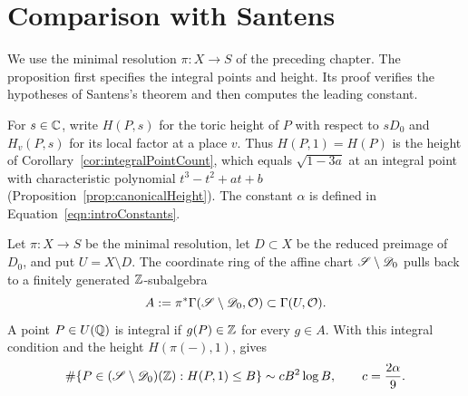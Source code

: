 \chapter{Comparison with Santens}

We use the minimal resolution $\pi:X\to S$ of the preceding chapter. The proposition first specifies the integral points and height. Its proof verifies the hypotheses of Santens's theorem and then computes the leading constant.

\begin{proposition}

\label{prop:santensConstant}


\leanok

For $s\in\mathbb{C}$, write $H(P,s)$ for the toric height of $P$ with respect to $sD_0$ and $H_v(P,s)$ for its local factor at a place $v$. Thus $H(P,1)=H(P)$ is the height of Corollary~\ref{cor:integralPointCount}, which equals $\sqrt{1-3a}$ at an integral point with characteristic polynomial $t^3-t^2+at+b$ (Proposition~\ref{prop:canonicalHeight}). The constant $\alpha$ is defined in Equation~\ref{eqn:introConstants}.

 Let $\pi\colon X\to S$ be the minimal resolution, let $D\subset X$ be the reduced preimage of $D_0$, and put $U=X\setminus D$. The coordinate ring of the affine chart $\mathscr{S}\setminus\mathscr{D}_0$ pulls back to a finitely generated $\mathbb{Z}$-subalgebra \[ A:=\pi^*\Gamma(\mathscr{S}\setminus\mathscr{D}_0,\mathcal O) \subset\Gamma(U,\mathcal O). \] A point $P\in U(\mathbb{Q})$ is integral if $g(P)\in\mathbb{Z}$ for every $g\in A$. With this integral condition and the height $H(\pi(-),1)$, \cite[Theorem~8.7]{santens2023integral} gives \[ \#\{P\in(\mathscr{S}\setminus\mathscr{D}_0)(\mathbb{Z}):H(P,1)\leq B\} \sim cB^2\log B,\qquad c=\frac{2\alpha}{9}. \] 

\end{proposition}

